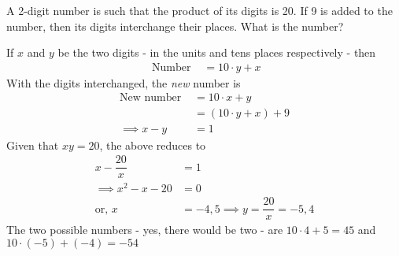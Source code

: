 

\question[2] A 2-digit number is such that the product of its digits is 20. If 9 
is added to the number, then its digits interchange their places. What is the 
number? 


\ifprintanswers
\fi 

\begin{solution}[\halfpage]
	If $x$ and $y$ be the two digits - in the units and tens places respectively - then
	\begin{align}
		\text{ Number } &= 10\cdot y + x 
	\end{align}
	With the digits interchanged, the \textit{new} number is 
	\begin{align}
		\text{New number } &= 10\cdot x + y \\
		                   &= (10\cdot y + x) + 9 \\
		   \implies x - y &= 1
	\end{align}
	Given that $xy = 20$, the above reduces to 
	\begin{align}
		x - \dfrac{20}{x} &= 1 \\
		\implies x^2 - x - 20 &= 0 \\
		\text{or, } x &= -4, 5 \implies y = \dfrac{20}{x} = -5, 4
	\end{align}
	The two possible numbers - yes, there would be two - are $10\cdot4 + 5 = 45$ 
	and $10\cdot (-5) + (-4) = -54$
\end{solution}
\ifprintanswers\begin{codex}\end{codex}\fi
